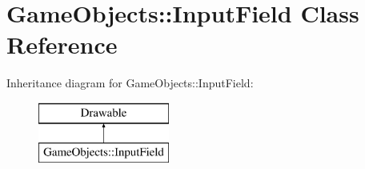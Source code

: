 \hypertarget{class_game_objects_1_1_input_field}{}\section{Game\+Objects\+::Input\+Field Class Reference}
\label{class_game_objects_1_1_input_field}
Inheritance diagram for Game\+Objects\+::Input\+Field\+:\begin{figure}[H]
\begin{center}
\leavevmode
\includegraphics[height=2.000000cm]{class_game_objects_1_1_input_field}
\end{center}
\end{figure}
